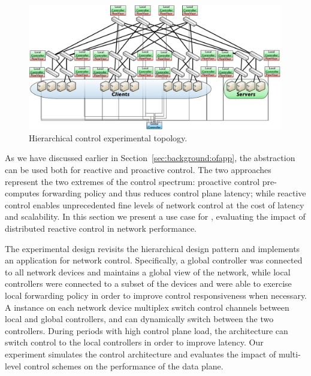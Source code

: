 \begin{figure}[h]
  \begin{center}
    \includegraphics[width=0.99\textwidth]{Chapter1/Chapter1Figs/hierarchy-topology}
  \end{center}
  \caption{Hierarchical control experimental topology.}
  \label{fig:sdnsim-use-case-topology}
\end{figure}

As we have discussed earlier in Section~\ref{sec:background:ofapp}, the \of
abstraction can be used both for reactive and proactive control.  The two
approaches represent the two extremes of the control spectrum: proactive control
pre-computes forwarding policy and thus reduces control plane latency; while
reactive control enables unprecedented fine levels of network control at the cost
of latency and scalability.  In this section we present a use case for \sdnsim,
evaluating the impact of distributed reactive control in network performance. 

The experimental design revisits the hierarchical design pattern and implements
an application for network control. Specifically, a global controller was
connected to all network devices and maintains a global view of the network,
while local controllers were connected to a subset of the devices and were able to
exercise local forwarding policy in order to improve control responsiveness when
necessary. A \flv instance on each network device multiplex switch control
channels between local and global controllers, and can dynamically switch between
the two controllers.  During periods with high control plane load, the
architecture can switch control to the local controllers in order to improve
latency.  Our experiment simulates the control architecture and evaluates the
impact of multi-level control schemes on the performance of the data plane. 

